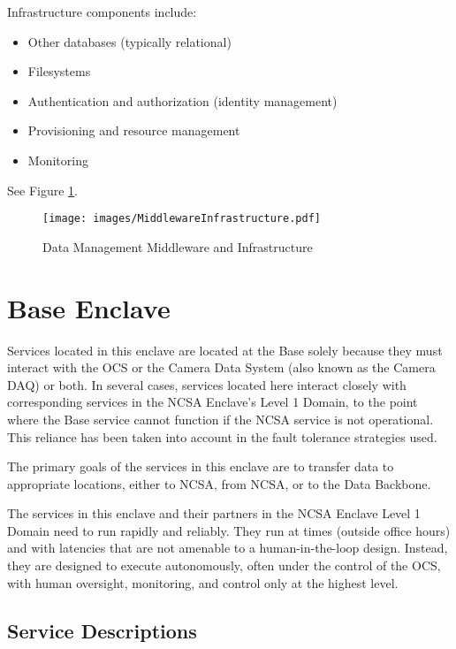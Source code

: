 \documentclass[DM,lsstdraft,toc]{lsstdoc}
\begin{document}
Infrastructure components include:
\begin{itemize}
\item
  Other databases (typically relational)
\item
  Filesystems
\item
  Authentication and authorization (identity management)
\item
  Provisioning and resource management
\item
  Monitoring
\end{itemize}

See Figure \ref{fig:mwandinfra}.

\begin{figure}
\centering
\texttt{[image: images/MiddlewareInfrastructure.pdf]}
\caption{Data Management Middleware and Infrastructure}
\label{fig:mwandinfra}
\end{figure}

\section{Base Enclave}\label{base-enclave}

Services located in this enclave are located at the Base solely because
they must interact with the OCS or the Camera Data System (also known as
the Camera DAQ) or both. In several cases, services located here
interact closely with corresponding services in the NCSA Enclave's Level
1 Domain, to the point where the Base service cannot function if the
NCSA service is not operational. This reliance has been taken into
account in the fault tolerance strategies used.

The primary goals of the services in this enclave are to transfer data
to appropriate locations, either to NCSA, from NCSA, or to the Data
Backbone.

The services in this enclave and their partners in the NCSA Enclave
Level 1 Domain need to run rapidly and reliably. They run at times
(outside office hours) and with latencies that are not amenable to a
human-in-the-loop design. Instead, they are designed to execute
autonomously, often under the control of the OCS, with human oversight,
monitoring, and control only at the highest level.

\subsection{Service Descriptions}\label{base-service-descriptions}
\end{document}
